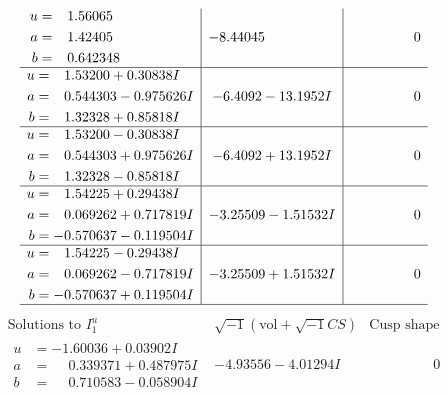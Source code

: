 \documentclass[1p]{elsarticle_modified}
\theoremstyle{definition}
\newcommand{\I}{\sqrt{-1}}
\begin{document}
$$\begin{array}{c|c|c}
\begin{aligned}
u &= \phantom{-}1.56065\phantom{ +0.000000I} \\
a &= \phantom{-}1.42405\phantom{ +0.000000I} \\
b &= \phantom{-}0.642348\phantom{ +0.000000I}\end{aligned}
 & -8.44045\phantom{ +0.000000I} & \phantom{-0.000000 } 0 \\ \hline\begin{aligned}
u &= \phantom{-}1.53200 + 0.30838 I \\
a &= \phantom{-}0.544303 - 0.975626 I \\
b &= \phantom{-}1.32328 + 0.85818 I\end{aligned}
 & -6.4092 - 13.1952 I & \phantom{-0.000000 } 0 \\ \hline\begin{aligned}
u &= \phantom{-}1.53200 - 0.30838 I \\
a &= \phantom{-}0.544303 + 0.975626 I \\
b &= \phantom{-}1.32328 - 0.85818 I\end{aligned}
 & -6.4092 + 13.1952 I & \phantom{-0.000000 } 0 \\ \hline\begin{aligned}
u &= \phantom{-}1.54225 + 0.29438 I \\
a &= \phantom{-}0.069262 + 0.717819 I \\
b &= -0.570637 - 0.119504 I\end{aligned}
 & -3.25509 - 1.51532 I & \phantom{-0.000000 } 0 \\ \hline\begin{aligned}
u &= \phantom{-}1.54225 - 0.29438 I \\
a &= \phantom{-}0.069262 - 0.717819 I \\
b &= -0.570637 + 0.119504 I\end{aligned}
 & -3.25509 + 1.51532 I & \phantom{-0.000000 } 0\\
 \hline 
 \end{array}$$\newpage$$\begin{array}{c|c|c}  
\text{Solutions to }I^u_{1}& \I (\text{vol} + \sqrt{-1}CS) & \text{Cusp shape}\\
 \hline 
\begin{aligned}
u &= -1.60036 + 0.03902 I \\
a &= \phantom{-}0.339371 + 0.487975 I \\
b &= \phantom{-}0.710583 - 0.058904 I\end{aligned}
 & -4.93556 - 4.01294 I & \phantom{-0.000000 } 0 \\ \hline\begin{aligned}

\end{aligned}
\end{array}$$
\end{document}
